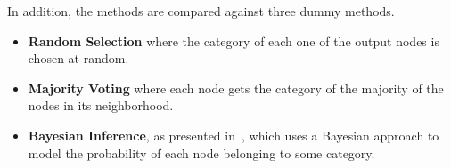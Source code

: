 
In addition, the methods are compared against three dummy methods.

\begin{itemize}
	\item \textbf{Random Selection} where the category of each one of the output nodes is chosen at random.
	\item \textbf{Majority Voting} where each node gets the category of the majority of the nodes in its neighborhood.
	\item \textbf{Bayesian Inference}, as presented in~\cite{fixman2016inference}, which uses a Bayesian approach to model the probability of each node belonging to some category.
\end{itemize}
